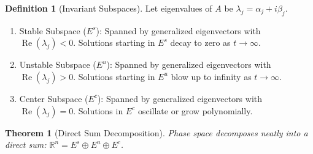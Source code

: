 \documentclass[12pt,a4paper,oneside]{article}
\theoremstyle{definition}
\newtheorem{definition}{Definition}[section]
\theoremstyle{plain}
\newtheorem{theorem}{Theorem}[section]
\begin{document}
\vspace{0.15cm}
\begin{definition}[Invariant Subspaces]
Let eigenvalues of $A$ be $\lambda_j = \alpha_j + i \beta_j$.
\begin{enumerate}
    \item Stable Subspace ($E^s$): Spanned by generalized eigenvectors with $\operatorname{Re}(\lambda_j) < 0$. Solutions starting in $E^s$ decay to zero as $t \to \infty$.
    \item Unstable Subspace ($E^u$): Spanned by generalized eigenvectors with $\operatorname{Re}(\lambda_j) > 0$. Solutions starting in $E^u$ blow up to infinity as $t \to \infty$.
    \item Center Subspace ($E^c$): Spanned by generalized eigenvectors with $\operatorname{Re}(\lambda_j) = 0$. Solutions in $E^c$ oscillate or grow polynomially.
\end{enumerate}
\end{definition}

\begin{theorem}[Direct Sum Decomposition]
Phase space decomposes neatly into a direct sum: $\mathbb{R}^n = E^s \oplus E^u \oplus E^c$.
\end{theorem}
\end{document}
